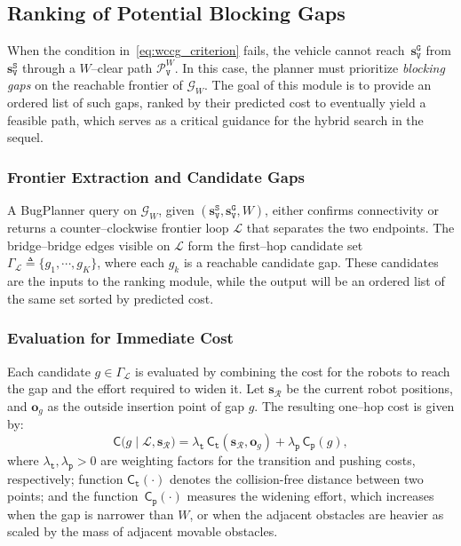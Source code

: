 \subsection{Ranking of Potential Blocking Gaps}\label{subsec:gap}

When the condition in~\eqref{eq:wccg_criterion} fails, the vehicle cannot
reach~$\mathbf{s}_\texttt{V}^{\texttt{G}}$ from
$\mathbf{s}_\texttt{V}^{\texttt{S}}$ through a $W$--clear path
$\mathcal{P}^W_\texttt{V}$. In this case, the planner must prioritize
\emph{blocking gaps} on the reachable frontier of $\mathcal{G}_W$. The goal of
this module is to provide an ordered list of such gaps, ranked by their
predicted cost to eventually yield a feasible path, which serves
as a critical guidance for the hybrid search in the sequel.

\subsubsection{Frontier Extraction and Candidate Gaps}
A BugPlanner query on $\mathcal{G}_W$, given
$(\mathbf{s}_\texttt{V}^{\texttt{S}},\mathbf{s}_\texttt{V}^{\texttt{G}},W)$,
either confirms connectivity or returns a counter--clockwise frontier loop
$\mathcal{L}$ that separates the two endpoints. The bridge--bridge edges
visible on $\mathcal{L}$ form the first--hop candidate set
$\Gamma_\mathcal{L}\triangleq\{g_1,\cdots,g_K\}$,
where each $g_k$ is a reachable candidate gap. These candidates are the inputs
to the ranking module, while the output will be an ordered list of the same
set sorted by predicted cost.

\subsubsection{Evaluation for Immediate Cost}
Each candidate $g\in\Gamma_\mathcal{L}$ is evaluated by combining the
cost for the robots to reach the gap and the effort required to widen it.
Let $\mathbf{s}_{\mathcal{R}}$ be the current robot positions,
and $\mathbf{o}_g$ as the outside insertion point of gap $g$. The
resulting one--hop cost is given by:
\begin{equation}\label{eq:step_cost}
\mathsf{C}\big(g \mid \mathcal{L}, \mathbf{s}_{\mathcal{R}}\big)
=\lambda_\texttt{t}\,\mathsf{C}_\texttt{t}\!\left(\mathbf{s}_{\mathcal{R}},\mathbf{o}_g\right)
+\lambda_\texttt{p}\,\mathsf{C}_\texttt{p}(g),
\end{equation}
where $\lambda_\texttt{t},\lambda_\texttt{p}>0$ are weighting factors
for the transition and pushing costs, respectively;
function $\mathsf{C}_\texttt{t}(\cdot)$ denotes the collision-free
distance between two points;
and the function~$\mathsf{C}_\texttt{p}(\cdot)$ measures the widening effort,
which increases when the gap is narrower than $W$,
or when the adjacent obstacles are heavier as scaled by the  mass of adjacent movable
obstacles.



